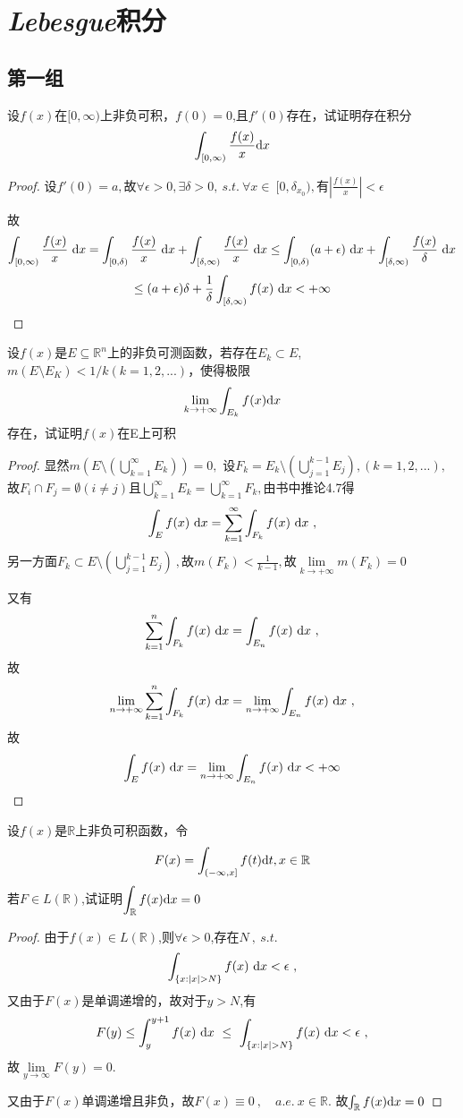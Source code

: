 \chapter{\emph{Lebesgue}积分}

\section{第一组}

设$f(x)$在$[0,\infty)$上非负可积，$f(0)=0$,且$f'(0)$存在，试证明存在积分$$\int_{[0,\infty)} \frac{f(x)}{x} \mathrm{d}x$$
\begin{proof}
设$f'(0)=a,$故$\forall \epsilon>0,\exists\delta>0,\ s.t. \ \forall x\in\ [0,\delta_{x_0}),$有$\left|\frac{f(x)}{x}\right|<\epsilon$\par 
故
$$\int_{[0,\infty)}\frac{f(x)}{x}\ \di{x}=
\int_{[0,\delta)}\frac{f(x)}{x}\ \di{x}+
\int_{[\delta,\infty)}\frac{f(x)}{x}\ \di{x}
\leq \int_{[0,\delta)}(a+\epsilon) \ \di{x}+
\int_{[\delta,\infty)}\frac{f(x)}{\delta}\ \di{x}$$
$$\leq (a+\epsilon)\delta +\frac{1}{\delta}\int_{[\delta,\infty)}f(x)\ \mathrm{d}x
<+\infty$$
\end{proof}



设$f(x)$是$E \subseteq \mathbb{R}^{n}$上的非负可测函数，若存在$E_k \subset E$,$m(E \setminus {E_K})<1/k(k=1,2,...)$，使得极限$$\lim\limits_{k \to +\infty} \int_{E_k} f(x) \mathrm{d}x $$存在，试证明$f(x)$在E上可积
\begin{proof}
显然$m\left(E\setminus (\bigcup\limits_{k=1}^{\infty}E_k) \right)=0,$
设$F_k=E_k\setminus (\bigcup\limits_{j=1}^{k-1}E_j),(k=1,2,...),$故$F_i\cap F_j=\emptyset(i\neq j)$且$\bigcup\limits_{k=1}^{\infty}E_k=\bigcup\limits_{k=1}^{\infty}F_k,$由书中推论4.7得$$\int_{E}f(x)\ \di{x}=\sum_{k=1}^{\infty}\int_{F_k}f(x)\ \di{x}\ ,$$另一方面$F_k\subset E\setminus\left(\bigcup\limits_{j=1}^{k-1}E_j\right)\ ,$故$m(F_k)<\frac{1}{k-1},$故$\lim\limits_{k \to +\infty}m(F_k)=0$\par 
又有$$\sum_{k=1}^{n}\int_{F_k}f(x)\ \di{x}=\int_{E_n}f(x)\ \di{x}\ ,$$故$$\lim\limits_{n \to +\infty}\sum_{k=1}^{n}\int_{F_k}f(x)\ \mathrm{d}x=\lim\limits_{n \to +\infty}\int_{E_n}f(x)\ \mathrm{d}x\ ,$$故$$\int_{E}f(x)\ \mathrm{d}x=\lim\limits_{n \to +\infty}\int_{E_n}f(x)\ \mathrm{d}x<+\infty$$
\end{proof}


设$f(x)$是$\mathbb{R}$上非负可积函数，令$$F(x)=\int_{(-\infty,x]}f(t) \mathrm{d}t,  x\in \mathbb{R}$$
若$F \in L(\mathbb{R}) $,试证明$\displaystyle{\int_{\mathbb{R}}f(x) \mathrm{d}x=0}$
\begin{proof}
由于$f(x)\in L(\mathbb{R})$,则$\forall \epsilon>0$,存在$N\ ,\ s.t.\ $$$\int_{\{x:|x|>N\}}f(x)\ \di{x}<\epsilon\ ,$$又由于$F(x)$是单调递增的，故对于$y>N$,有$$F(y)\leq \int_{y}^{y+1}f(x)\ \di{x} \ \leq\ \int_{\{x:|x|>N\}}f(x)\ \di{x}<\epsilon\ ,$$故$\lim\limits_{y \to \infty}F(y)=0.$\par
又由于$F(x)$单调递增且非负，故$F(x)\equiv 0\ ,\quad a.e. \ x \in \mathbb{R}.$ 故$\int_{\mathbb{R}}f(x) \mathrm{d}x=0$
\end{proof}




